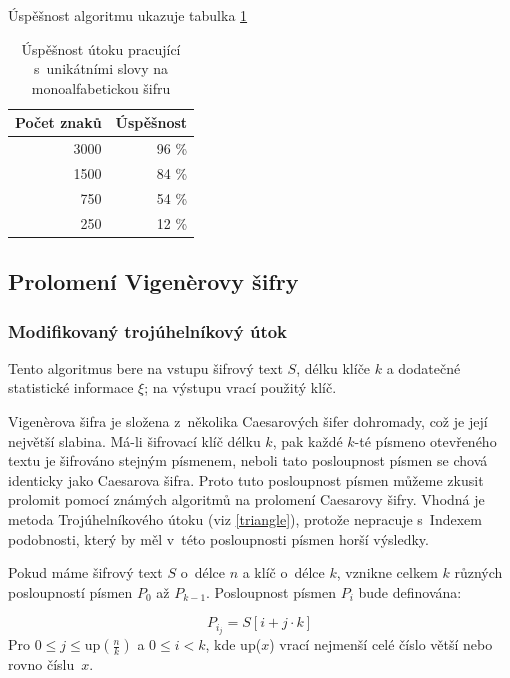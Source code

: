 \documentclass[12pt]{article}
\theoremstyle{definition}
\newcommand{\stats}{\xi}
\begin{document}
Úspěšnost algoritmu ukazuje tabulka \ref{tabmono}

\begin{table}[ht]
  \begin{center}
    \begin{tabular}{|r|r|}
    \hline
    Počet znaků&Úspěšnost\\
    \hline
    3000&96 \%\\
    1500&84 \%\\
    750&54 \%\\
    250&12 \%\\
    \hline
    \end{tabular}
    \caption{Úspěšnost útoku pracující s~unikátními slovy na monoalfabetickou šifru} 
    \label{tabmono}
  \end{center}
\end{table}




\newpage
\subsection{Prolomení Vigenèrovy šifry}
\subsubsection{Modifikovaný trojúhelníkový útok}
\label{mtu}
Tento algoritmus bere na vstupu šifrový text $S$, délku klíče $k$ a dodatečné statistické informace $\stats$; na výstupu vrací použitý klíč. 

Vigenèrova šifra je složena z~několika Caesarových šifer dohromady, což je její největší slabina. Má-li šifrovací klíč délku $k$, pak každé $k$-té písmeno otevřeného textu je šifrováno stejným písmenem, neboli tato posloupnost písmen se chová identicky jako Caesarova šifra. Proto tuto posloupnost písmen můžeme zkusit prolomit pomocí známých algoritmů na prolomení Caesarovy šifry. Vhodná je metoda Trojúhelníkového útoku (viz \ref{triangle}), protože nepracuje s~Indexem podobnosti, který by měl v~této posloupnosti písmen horší výsledky.

Pokud máme šifrový text $S$ o~délce $n$ a klíč o~délce $k$, vznikne celkem $k$ různých posloupností písmen $P_0$ až $P_{k-1}$. Posloupnost písmen $P_i$ bude definována:

$$P_{i_j} = S\left[i+j\cdot k\right]$$
Pro $0\le j \le \mbox{up}(\frac{n}{k})$ a $0\le i < k$, kde up($x$) vrací nejmenší celé číslo větší nebo rovno číslu~$x$.
\end{document}

